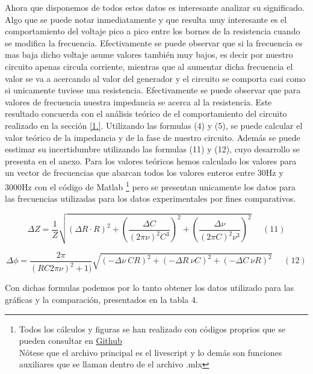 \documentclass[article, 11pt]{report}
\begin{document}
Ahora que disponemos de todos estos datos es interesante analizar su significado. Algo que se puede notar inmediatamente y que resulta muy interesante es el comportamiento del voltaje pico a pico entre los bornes de la resistencia cuando se modifica la frecuencia. Efectivamente se puede observar que si la frecuencia es mas baja dicho voltaje asume valores también muy bajos, es decir por nuestro circuito apenas circula corriente, mientras que al aumentar dicha frecuencia el valor se va a acercando al valor del generador y el circuito se comporta casi como si unicamente tuviese una resistencia. Efectivamente se puede observar que para valores de frecuencia nuestra impedancia se acerca al la resistencia. Este resultado concuerda con el análisis teórico de el comportamiento del circuito realizado en la sección \ref{1.}. Utilizando las formulas (4) y (5), se puede calcular el valor teórico de la impedancia y de la fase de nuestro circuito. Además se puede esstimar su incertidumbre utilizando las formulas (11) y (12), cuyo desarrollo se presenta en el anexo. Para los valores teóricos hemos calculado los valores para un vector de frecuencias que abarcan todos los valores enteros entre 30Hz y 3000Hz con el código de Matlab \footnote{Todos los cálculos y figuras se han realizado con códigos proprios que se pueden consultar en \href{https://github.com/NicolasLobat/P19B_Lobato_delaCruz_Diego_Nicolas.git}{Github}  \\Nótese que el archivo principal es el livescript y lo demás son funciones auxiliares que se llaman dentro de el archivo .mlx } pero se presentan unicamente los datos para las frecuencias utilizadas para los datos experimentales por fines comparativos.

$$\Delta Z = \dfrac{1}{Z} \sqrt{ (\Delta R \cdot R)^2 + \left(\dfrac{\Delta C}{(2\pi \nu)^2 C^3}\right)^2  + \left(\dfrac{\Delta \nu}{(2\pi C)^2 \nu^3 }\right)^2 } ~~~~~~(11)$$

$$ \Delta \phi = \dfrac{2\pi}{(RC2\pi \nu)^2 +1 )} \sqrt{(-\Delta\nu ~CR)^2 +(-\Delta R ~ \nu C)^2 + (-\Delta C ~ \nu R)^2} ~~~~~~ (12)$$



\vspace{0.25cm}
Con dichas formulas podemos por lo tanto obtener los datos utilizado para las gráficas y la comparación, presentados en la tabla 4.
\end{document}
